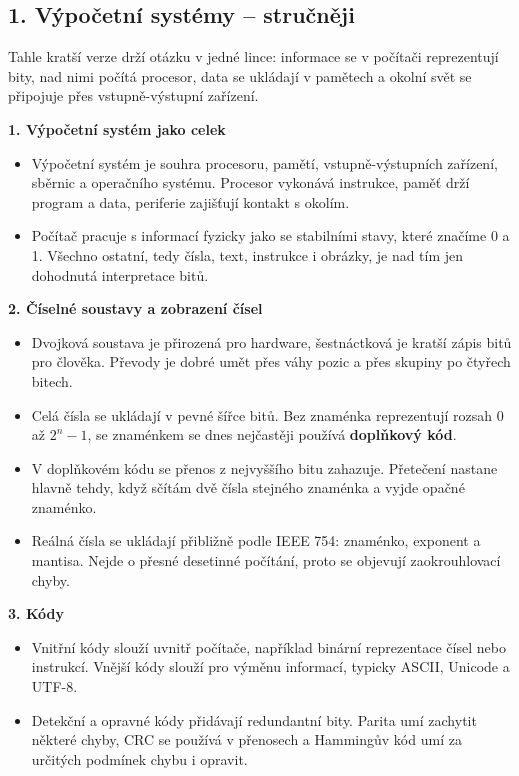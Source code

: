 
\subsection*{1. Výpočetní systémy -- stručněji}
Tahle kratší verze drží otázku v jedné lince: informace se v počítači reprezentují bity, nad nimi počítá procesor, data se ukládají v pamětech a okolní svět se připojuje přes vstupně-výstupní zařízení.

\textbf{1. Výpočetní systém jako celek}
\begin{itemize}
  \item Výpočetní systém je souhra procesoru, pamětí, vstupně-výstupních zařízení, sběrnic a operačního systému. Procesor vykonává instrukce, paměť drží program a data, periferie zajišťují kontakt s okolím.
  \item Počítač pracuje s informací fyzicky jako se stabilními stavy, které značíme 0 a 1. Všechno ostatní, tedy čísla, text, instrukce i obrázky, je nad tím jen dohodnutá interpretace bitů.
\end{itemize}

\textbf{2. Číselné soustavy a zobrazení čísel}
\begin{itemize}
  \item Dvojková soustava je přirozená pro hardware, šestnáctková je kratší zápis bitů pro člověka. Převody je dobré umět přes váhy pozic a přes skupiny po čtyřech bitech.
  \item Celá čísla se ukládají v pevné šířce bitů. Bez znaménka reprezentují rozsah 0 až $2^n-1$, se znaménkem se dnes nejčastěji používá \textbf{doplňkový kód}.
  \item V doplňkovém kódu se přenos z nejvyššího bitu zahazuje. Přetečení nastane hlavně tehdy, když sčítám dvě čísla stejného znaménka a vyjde opačné znaménko.
  \item Reálná čísla se ukládají přibližně podle IEEE 754: znaménko, exponent a mantisa. Nejde o přesné desetinné počítání, proto se objevují zaokrouhlovací chyby.
\end{itemize}

\textbf{3. Kódy}
\begin{itemize}
  \item Vnitřní kódy slouží uvnitř počítače, například binární reprezentace čísel nebo instrukcí. Vnější kódy slouží pro výměnu informací, typicky ASCII, Unicode a UTF-8.
  \item Detekční a opravné kódy přidávají redundantní bity. Parita umí zachytit některé chyby, CRC se používá v přenosech a Hammingův kód umí za určitých podmínek chybu i opravit.
\end{itemize}

